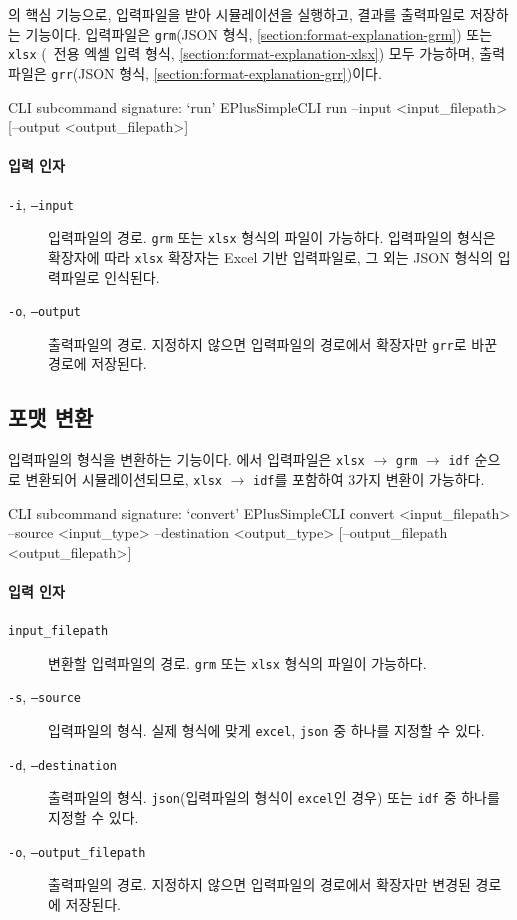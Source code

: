 \simulator 의 핵심 기능으로, 입력파일을 받아 시뮬레이션을 실행하고, 결과를 출력파일로 저장하는 기능이다. 입력파일은 \texttt{grm}(JSON 형식, \ref{section:format-explanation-grm}) 또는 \texttt{xlsx} (\simulator\ 전용 엑셀 입력 형식, \ref{section:format-explanation-xlsx}) 모두 가능하며, 출력파일은 \texttt{grr}(JSON 형식, \ref{section:format-explanation-grr})이다.

\begin{codeblock}{CLI subcommand signature: `run'}
EPlusSimpleCLI run --input <input_filepath> [--output <output_filepath>]
\end{codeblock}

\paragraph{입력 인자}
\begin{description}
  \item[\texttt{-i}, \texttt{--input}] 입력파일의 경로. \texttt{grm} 또는 \texttt{xlsx} 형식의 파일이 가능하다. 입력파일의 형식은 확장자에 따라 \texttt{xlsx} 확장자는 Excel 기반 입력파일로, 그 외는 JSON 형식의 입력파일로 인식된다.
  \item[\texttt{-o}, \texttt{--output}] 출력파일의 경로. 지정하지 않으면 입력파일의 경로에서 확장자만 \texttt{grr}로 바꾼 경로에 저장된다.
\end{description}

\subsection{포맷 변환}
\label{subsection:clisubcommands-convert}

입력파일의 형식을 변환하는 기능이다. \simulator 에서 입력파일은 \texttt{xlsx} $\rightarrow$ \texttt{grm} $\rightarrow$ \texttt{idf} 순으로 변환되어 시뮬레이션되므로, \texttt{xlsx} $\rightarrow$ \texttt{idf}를 포함하여 3가지 변환이 가능하다.

\begin{codeblock}{CLI subcommand signature: `convert'}
EPlusSimpleCLI convert <input_filepath> --source <input_type> --destination <output_type> [--output_filepath <output_filepath>]
\end{codeblock}

\paragraph{입력 인자}
\begin{description}
  \item[\texttt{input\_filepath}] 변환할 입력파일의 경로. \texttt{grm} 또는 \texttt{xlsx} 형식의 파일이 가능하다.
  \item[\texttt{-s}, \texttt{--source}] 입력파일의 형식. 실제 형식에 맞게 \texttt{excel}, \texttt{json} 중 하나를 지정할 수 있다.
  \item[\texttt{-d}, \texttt{--destination}] 출력파일의 형식. \texttt{json}(입력파일의 형식이 \texttt{excel}인 경우) 또는 \texttt{idf} 중 하나를 지정할 수 있다.
  \item[\texttt{-o}, \texttt{--output\_filepath}] 출력파일의 경로. 지정하지 않으면 입력파일의 경로에서 확장자만 변경된 경로에 저장된다.
\end{description}

